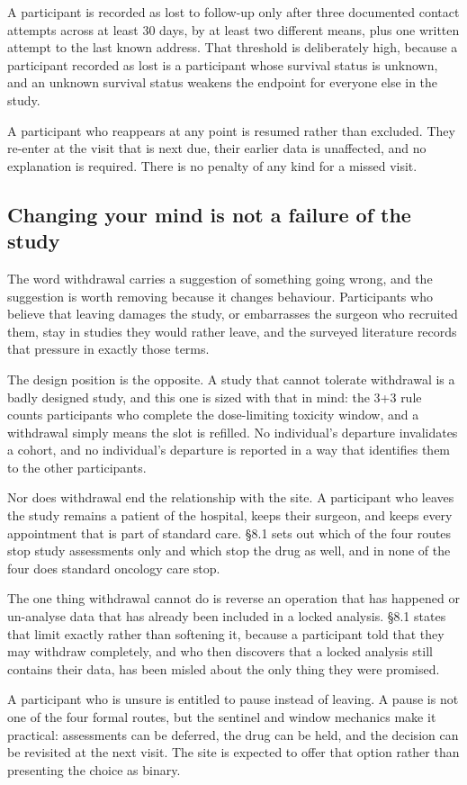 A participant is recorded as lost to follow-up only after three documented
contact attempts across at least 30 days, by at least two different means, plus
one written attempt to the last known address. That threshold is deliberately
high, because a participant recorded as lost is a participant whose survival
status is unknown, and an unknown survival status weakens the endpoint for
everyone else in the study.

A participant who reappears at any point is resumed rather than excluded. They
re-enter at the visit that is next due, their earlier data is unaffected, and no
explanation is required. There is no penalty of any kind for a missed visit.

\subsection{Changing your mind is not a failure of the study}

The word withdrawal carries a suggestion of something going wrong, and the
suggestion is worth removing because it changes behaviour. Participants who
believe that leaving damages the study, or embarrasses the surgeon who recruited
them, stay in studies they would rather leave, and the surveyed literature
records that pressure in exactly those terms.

The design position is the opposite. A study that cannot tolerate withdrawal is
a badly designed study, and this one is sized with that in mind: the 3+3 rule
counts participants who complete the dose-limiting toxicity window, and a
withdrawal simply means the slot is refilled. No individual's departure
invalidates a cohort, and no individual's departure is reported in a way that
identifies them to the other participants.

Nor does withdrawal end the relationship with the site. A participant who leaves
the study remains a patient of the hospital, keeps their surgeon, and keeps
every appointment that is part of standard care. \S 8.1 sets out which of the
four routes stop study assessments only and which stop the drug as well, and in
none of the four does standard oncology care stop.

The one thing withdrawal cannot do is reverse an operation that has happened or
un-analyse data that has already been included in a locked analysis. \S 8.1
states that limit exactly rather than softening it, because a participant told
that they may withdraw completely, and who then discovers that a locked analysis
still contains their data, has been misled about the only thing they were
promised.

A participant who is unsure is entitled to pause instead of leaving. A pause is
not one of the four formal routes, but the sentinel and window mechanics make it
practical: assessments can be deferred, the drug can be held, and the decision
can be revisited at the next visit. The site is expected to offer that option
rather than presenting the choice as binary.
